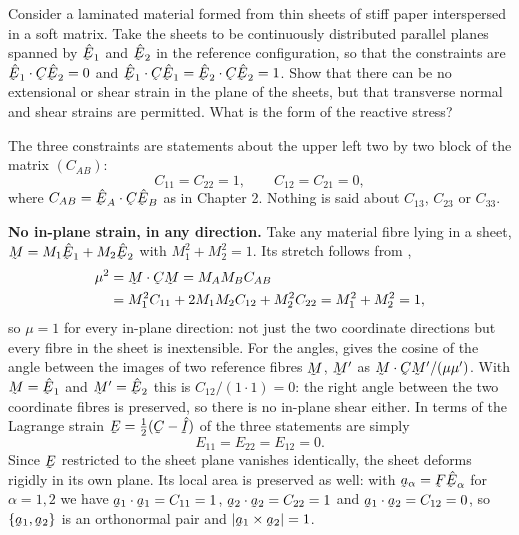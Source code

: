 \begin{problem}
Consider a laminated material formed from thin sheets of stiff paper
interspersed in a soft matrix. Take the sheets to be continuously
distributed parallel planes spanned by $\hbE_{1}$ and $\hbE_{2}$ in the
reference configuration, so that the constraints are
$\ip{\hbE_{1}}{\bC\hbE_{2}}=0$ and
$\ip{\hbE_{1}}{\bC\hbE_{1}}=\ip{\hbE_{2}}{\bC\hbE_{2}}=1$. Show that
there can be no extensional or shear strain in the plane of the sheets,
but that transverse normal and shear strains are permitted. What is the
form of the reactive stress?
\end{problem}

\begin{solution}
The three constraints are statements about the upper left two by two
block of the matrix $(C_{AB})$:
\[
   C_{11}=C_{22}=1,\qquad C_{12}=C_{21}=0 ,
\]
where $C_{AB}=\ip{\hbE_{A}}{\bC\hbE_{B}}$ as in Chapter 2. Nothing is
said about $C_{13}$, $C_{23}$ or $C_{33}$.

\textbf{No in-plane strain, in any direction.} Take any material fibre
lying in a sheet, $\bM=M_{1}\hbE_{1}+M_{2}\hbE_{2}$ with
$M_{1}^{2}+M_{2}^{2}=1$. Its stretch follows from ,
\[
\begin{aligned}
   \mu^{2}&=\ip\bM{\bC\bM}=M_{A}M_{B}C_{AB}
   \\
   &=M_{1}^{2}C_{11}+2M_{1}M_{2}C_{12}+M_{2}^{2}C_{22}
   =M_{1}^{2}+M_{2}^{2}=1 ,
\end{aligned}
\]
so $\mu=1$ for every in-plane direction: not just the two coordinate
directions but every fibre in the sheet is inextensible. For the angles,
 gives the cosine of the angle between the images of two
reference fibres $\bM$, $\bM'$ as
$\ip\bM{\bC\bM'}/(\mu\mu')$. With $\bM=\hbE_{1}$ and $\bM'=\hbE_{2}$ this
is $C_{12}/(1\cdot1)=0$: the right angle between the two coordinate
fibres is preserved, so there is no in-plane shear either. In terms of
the Lagrange strain $\bE=\tfrac12(\bC-\hI)$ of  the three
statements are simply
\[
   E_{11}=E_{22}=E_{12}=0 .
\]
Since $\bE$ restricted to the sheet plane vanishes identically, the sheet
deforms rigidly in its own plane. Its local area is preserved as well:
with $\ba_{\alpha}=\bF\hbE_{\alpha}$ for $\alpha=1,2$ we have
$\ip{\ba_{1}}{\ba_{1}}=C_{11}=1$, $\ip{\ba_{2}}{\ba_{2}}=C_{22}=1$ and
$\ip{\ba_{1}}{\ba_{2}}=C_{12}=0$, so $\{\ba_{1},\ba_{2}\}$ is an
orthonormal pair and $|\ba_{1}\times\ba_{2}|=1$.


\end{solution}
